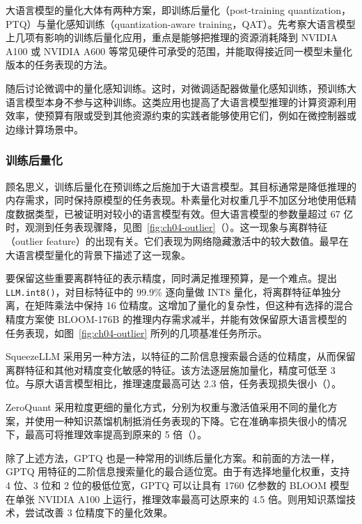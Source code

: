 大语言模型的量化大体有两种方案，即训练后量化（post-training quantization，PTQ）与量化感知训练（quantization-aware training，QAT）。先考察大语言模型上几项有影响的训练后量化应用，重点是能够把推理的资源消耗降到 NVIDIA A100 或 NVIDIA A600 等常见硬件可承受的范围，并能取得接近同一模型未量化版本的任务表现的方法。

随后讨论微调中的量化感知训练。这时，对微调适配器做量化感知训练，预训练大语言模型本身不参与这种训练。这类应用也提高了大语言模型推理的计算资源利用效率，使预算有限或受到其他资源约束的实践者能够使用它们，例如在微控制器或边缘计算场景中。

\subsubsection{训练后量化}
\label{sec:ch04-ptq}
顾名思义，训练后量化在预训练之后施加于大语言模型。其目标通常是降低推理的内存需求，同时保持原模型的任务表现。朴素量化对权重几乎不加区分地使用低精度数据类型，已被证明对较小的语言模型有效。但大语言模型的参数量超过 67 亿时，观测到任务表现骤降，见图~\ref{fig:ch04-outlier}（）。这一现象与离群特征（outlier feature）的出现有关。它们表现为网络隐藏激活中的较大数值。最早在大语言模型量化的背景下描述了这一现象。

要保留这些重要离群特征的表示精度，同时满足推理预算，是一个难点。提出 \texttt{LLM.int8()}，对目标特征中的 99.9\% 逐向量做 INT8 量化，将离群特征单独分离，在矩阵乘法中保持 16 位精度。这增加了量化的复杂性，但这种有选择的混合精度方案使 BLOOM-176B 的推理内存需求减半，并能有效保留原大语言模型的任务表现，如图~\ref{fig:ch04-outlier} 所列的几项基准任务所示。

SqueezeLLM 采用另一种方法，以特征的二阶信息搜索最合适的位精度，从而保留离群特征和其他对精度变化敏感的特征。该方法逐层施加量化，精度可低至 3 位。与原大语言模型相比，推理速度最高可达 2.3 倍，任务表现损失很小（）。

ZeroQuant 采用粒度更细的量化方式，分别为权重与激活值采用不同的量化方案，并使用一种知识蒸馏机制抵消任务表现的下降。它在准确率损失很小的情况下，最高可将推理效率提高到原来的 5 倍（）。

除了上述方法，GPTQ 也是一种常用的训练后量化方案。和前面的方法一样，GPTQ 用特征的二阶信息搜索量化的最合适位宽。由于有选择地量化权重，支持 4 位、3 位和 2 位的极低位宽，GPTQ 可以让具有 1760 亿参数的 BLOOM 模型在单张 NVIDIA A100 上运行，推理效率最高可达原来的 4.5 倍。则用知识蒸馏技术，尝试改善 3 位精度下的量化效果。

